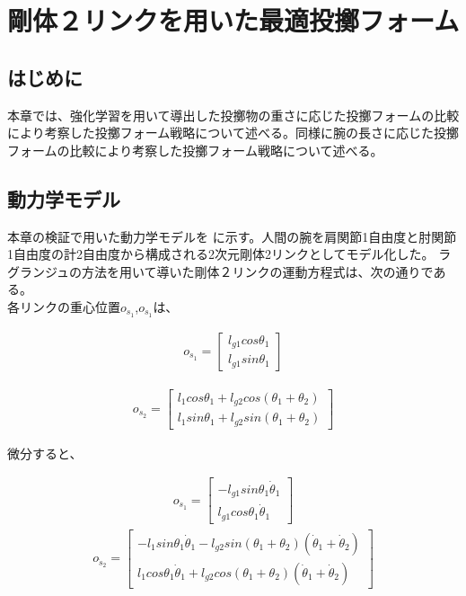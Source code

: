 \chapter[剛体２リンクによる最適投擲シミュレーション]{剛体２リンクを用いた最適投擲フォーム}

\section{はじめに}
本章では、強化学習を用いて導出した投擲物の重さに応じた投擲フォームの比較により考察した投擲フォーム戦略について述べる。同様に腕の長さに応じた投擲フォームの比較により考察した投擲フォーム戦略について述べる。
\section{動力学モデル}
本章の検証で用いた動力学モデルを
に示す。人間の腕を肩関節1自由度と肘関節1自由度の計2自由度から構成される2次元剛体2リンクとしてモデル化した。
ラグランジュの方法を用いて導いた剛体２リンクの運動方程式は、次の通りである。\\
各リンクの重心位置$o_{s_{1}}$,$o_{s_{1}}$は、

\begin{eqnarray}
  o_{s_{1}} = 
              \begin{bmatrix}
              l_{g1}cos\theta_{1}\\
              l_{g1}sin\theta_{1}
              \end{bmatrix}
\end{eqnarray}

\begin{eqnarray}
  o_{s_{2}} = 
              \begin{bmatrix}
              l_{1}cos\theta_{1} + l_{g2}cos(\theta_{1} + \theta_{2})\\
              l_{1}sin\theta_{1} + l_{g2}sin(\theta_{1} + \theta_{2})
              \end{bmatrix}
\end{eqnarray}

微分すると、

\begin{eqnarray}
  o_{\dot{s}_{1}} = 
              \begin{bmatrix}
              -l_{g1}sin\theta_{1}\dot{\theta}_{1}\\
              l_{g1}cos\theta_{1}\dot{\theta}_{1}
              \end{bmatrix}
\end{eqnarray}
\begin{eqnarray}
  o_{\dot{s}_{2}} = 
              \begin{bmatrix}
                -l_{1}sin\theta_{1}\dot{\theta}_{1} - l_{g2}sin(\theta_{1} + \theta_{2})(\dot{\theta}_{1} + \dot{\theta}_{2})\\
                l_{1}cos\theta_{1}\dot{\theta}_{1} + l_{g2}cos(\theta_{1} + \theta_{2})(\dot{\theta}_{1} + \dot{\theta}_{2})
              \end{bmatrix}
\end{eqnarray}

